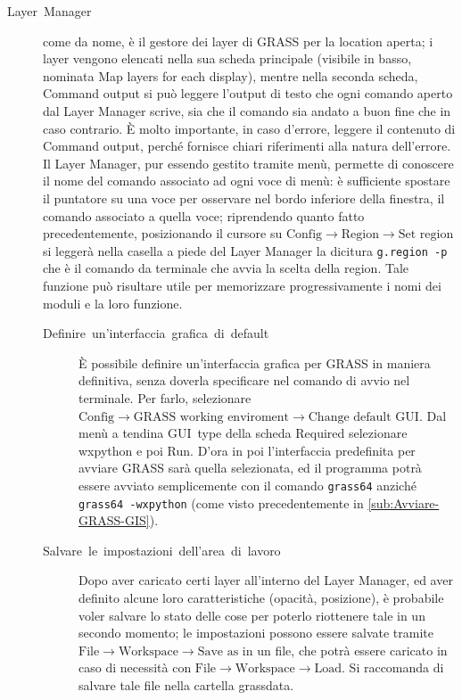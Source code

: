 		\begin{description}
			\item [{Layer~Manager}] come da nome, è il gestore dei layer di GRASS per la location aperta; i layer vengono elencati nella sua scheda principale (visibile in basso, nominata \textsf{Map layers for each display}), mentre nella seconda scheda, \textsf{Command output} si può leggere l'output di testo che ogni comando aperto dal Layer Manager scrive, sia che il comando sia andato a buon fine che in caso contrario.  È molto importante, in caso d'errore, leggere il contenuto di \textsf{Command output}, perché fornisce chiari riferimenti alla natura dell'errore. Il Layer Manager, pur essendo gestito tramite menù, permette di conoscere il nome del comando associato ad ogni voce di menù: è sufficiente spostare il puntatore su una voce per osservare nel bordo inferiore della finestra, il comando associato a quella voce; riprendendo quanto fatto precedentemente, posizionando il cursore su \textsf{$\text{Config}\rightarrow \text{Region}\rightarrow \text{Set~region}$} si leggerà nella casella a piede del Layer Manager la dicitura \texttt{g.region -p} che è il comando da terminale che avvia la scelta della region. Tale funzione può risultare utile per memorizzare progressivamente i nomi dei moduli e la loro funzione.
				
				\begin{description}
					\item [{\label{des:Definireun'interfacciagraficadidefault}Definire~un'interfaccia~grafica~di~default}] È possibile definire un'interfaccia grafica per GRASS in maniera definitiva, senza doverla specificare nel comando di avvio nel terminale. Per farlo, selezionare \textsf{$\text{Config}\rightarrow \text{GRASS~working~enviroment}\rightarrow \text{Change~default~GUI}$}. Dal menù a tendina \textsf{GUI~type} della scheda \textsf{Required} selezionare \textsf{wxpython} e poi \textsf{Run}. D'ora in poi l'interfaccia predefinita per avviare GRASS sarà quella selezionata, ed il programma potrà essere avviato semplicemente con il comando \texttt{grass64} anziché \texttt{grass64 -wxpython} (come visto precedentemente in \textsection\ref{sub:Avviare-GRASS-GIS}).
					\item [{Salvare~le~impostazioni~dell'area~di~lavoro}] Dopo aver caricato certi layer all'interno del Layer Manager, ed aver definito alcune loro caratteristiche (opacità, posizione), è probabile voler salvare lo stato delle cose per poterlo riottenere tale in un secondo momento; le impostazioni possono essere salvate tramite \textsf{$\text{File}\rightarrow \text{Workspace}\rightarrow \text{Save~as}$} in un file, che potrà essere caricato in caso di necessità con \textsf{$\text{File}\rightarrow \text{Workspace}\rightarrow \text{Load}$}. Si raccomanda di salvare tale file nella cartella \textsf{grassdata}.
				\end{description}
			

\end{description}
